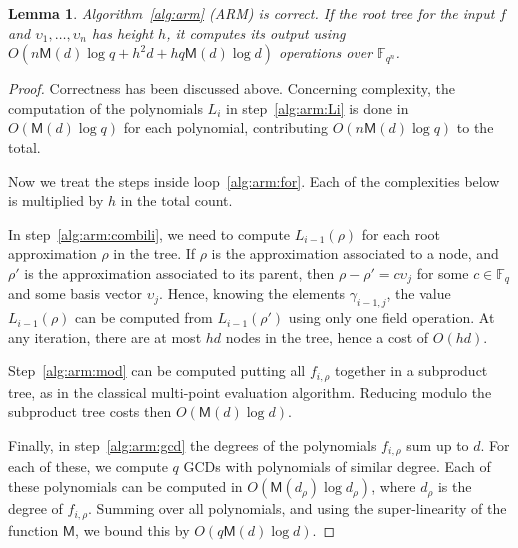 \documentclass{sig-alternate}
\newcommand{\ff}[1]{\mathbb{F}_{#1}}
\newcommand{\dd}{d}
\newcommand{\qq}{q}
\newcommand{\nn}{n}
\newcommand{\qn}{{\qq^\nn}}
\newcommand{\basef}{\ff{\qq}}
\newcommand{\extf}{\ff{\qn}}
\newcommand{\Mul}{\mathsf{M}}
\newcounter{algo}
\newtheorem{Lem}{Lemma}
\begin{document}
 \begin{Lem}
 \label{complexity_arm}
   Algorithm~\ref{alg:arm} (ARM) is correct. If the root tree for the
   input $f$ and $\upsilon_1,\dots,\upsilon_\nn$ has height $h$, it
   computes its output using $O(\nn\Mul(\dd)\log\qq + h^2\dd +
   h\qq\Mul(\dd)\log\dd)$ operations over $\extf$.
 \end{Lem}
 \begin{proof}
   Correctness has been discussed above. Concerning complexity, the
   computation of the polynomials $L_i$ in step~\ref{alg:arm:Li} is
   done in $O(\Mul(\dd)\log\qq)$ for each polynomial, contributing
   $O(\nn\Mul(\dd)\log\qq)$ to the total.

   Now we treat the steps inside loop~\ref{alg:arm:for}.  Each of the
   complexities below is multiplied by $h$ in the total count.

   In step~\ref{alg:arm:combili}, we need to compute $L_{i-1}(\rho)$
   for each root approximation $\rho$ in the tree. If $\rho$ is the
   approximation associated to a node, and $\rho'$ is the
   approximation associated to its parent, then
   $\rho-\rho'=c\upsilon_j$ for some $c\in\basef$ and some basis
   vector $\upsilon_j$. Hence, knowing the elements $\gamma_{i-1,j}$,
   the value $L_{i-1}(\rho)$ can be computed from $L_{i-1}(\rho')$
   using only one field operation. At any iteration, there are at most
   $hd$ nodes in the tree, hence a cost of $O(hd)$.

   Step~\ref{alg:arm:mod} can be computed putting all $f_{i,\rho}$
   together in a subproduct tree, as in the classical multi-point
   evaluation algorithm. Reducing modulo the subproduct tree costs
   then $O(\Mul(\dd)\log\dd)$.

   Finally, in step~\ref{alg:arm:gcd} the degrees of the polynomials
   $f_{i,\rho}$ sum up to $\dd$. For each of these, we compute $\qq$
   GCDs with polynomials of similar degree. Each of these polynomials
   can be computed in $O(\Mul(\dd_\rho)\log\dd_\rho)$, where
   $\dd_\rho$ is the degree of $f_{i,\rho}$. Summing over all
   polynomials, and using the super-linearity of the function $\Mul$,
   we bound this by $O(\qq\Mul(d)\log d)$.
 \end{proof}
\end{document}
